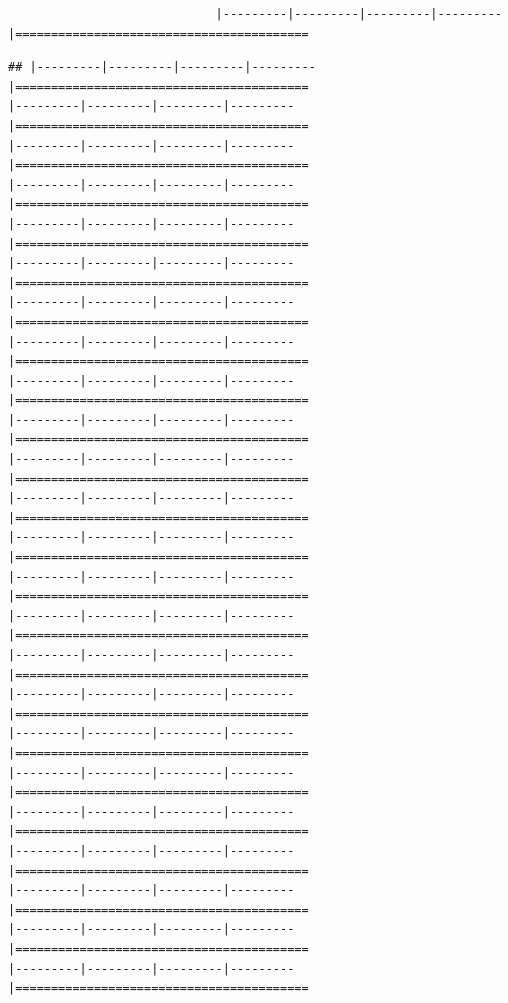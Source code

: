 \documentclass[
]{article}
\begin{document}
\begin{verbatim}
                             |---------|---------|---------|---------|=========================================                                          
\end{verbatim}

\begin{verbatim}
## |---------|---------|---------|---------|=========================================                                          |---------|---------|---------|---------|=========================================                                          |---------|---------|---------|---------|=========================================                                          |---------|---------|---------|---------|=========================================                                          |---------|---------|---------|---------|=========================================                                          |---------|---------|---------|---------|=========================================                                          |---------|---------|---------|---------|=========================================                                          |---------|---------|---------|---------|=========================================                                          |---------|---------|---------|---------|=========================================                                          |---------|---------|---------|---------|=========================================                                          |---------|---------|---------|---------|=========================================                                          |---------|---------|---------|---------|=========================================                                          |---------|---------|---------|---------|=========================================                                          |---------|---------|---------|---------|=========================================                                          |---------|---------|---------|---------|=========================================                                          |---------|---------|---------|---------|=========================================                                          |---------|---------|---------|---------|=========================================                                          |---------|---------|---------|---------|=========================================                                          |---------|---------|---------|---------|=========================================                                          |---------|---------|---------|---------|=========================================                                          |---------|---------|---------|---------|=========================================                                          |---------|---------|---------|---------|=========================================                                          |---------|---------|---------|---------|=========================================                                          |---------|---------|---------|---------|=========================================                                          
\end{verbatim}
\end{document}
